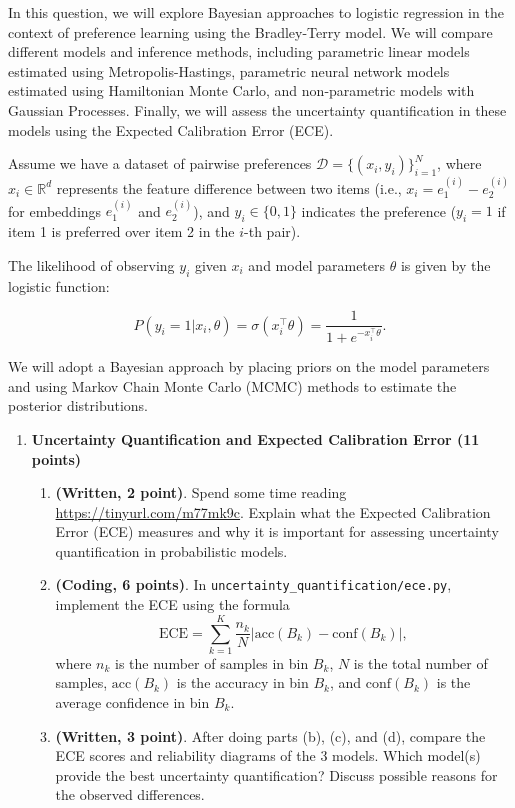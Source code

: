 \documentclass[
  letterpaper,
  numbers=noenddot,
  DIV=11]{scrreprt}
\theoremstyle{definition}
\theoremstyle{plain}
\theoremstyle{plain}
\theoremstyle{remark}
\begin{document}
In this question, we will explore Bayesian approaches to logistic
regression in the context of preference learning using the Bradley-Terry
model. We will compare different models and inference methods, including
parametric linear models estimated using Metropolis-Hastings, parametric
neural network models estimated using Hamiltonian Monte Carlo, and
non-parametric models with Gaussian Processes. Finally, we will assess
the uncertainty quantification in these models using the Expected
Calibration Error (ECE).

Assume we have a dataset of pairwise preferences
\(\mathcal{D} = \{(x_i, y_i)\}_{i=1}^N\), where \(x_i \in \mathbb{R}^d\)
represents the feature difference between two items (i.e.,
\(x_i = e^{(i)}_1 - e^{(i)}_2\) for embeddings \(e^{(i)}_1\) and
\(e^{(i)}_2\)), and \(y_i \in \{0, 1\}\) indicates the preference
(\(y_i = 1\) if item 1 is preferred over item 2 in the \(i\)-th pair).

The likelihood of observing \(y_i\) given \(x_i\) and model parameters
\(\theta\) is given by the logistic function:

\[P(y_i = 1 | x_i, \theta) = \sigma(x_i^\top \theta) = \frac{1}{1 + e^{-x_i^\top \theta}}.\]

We will adopt a Bayesian approach by placing priors on the model
parameters and using Markov Chain Monte Carlo (MCMC) methods to estimate
the posterior distributions.

\begin{enumerate}
\def\labelenumi{(\alph{enumi})}
\item
  \textbf{Uncertainty Quantification and Expected Calibration Error (11
  points)}

  \begin{enumerate}
  \def\labelenumii{(\roman{enumii})}
  \item
    \textbf{(Written, 2 point)}. Spend some time reading
    \url{https://tinyurl.com/m77mk9c}. Explain what the Expected
    Calibration Error (ECE) measures and why it is important for
    assessing uncertainty quantification in probabilistic models.
  \item
    \textbf{(Coding, 6 points)}. In
    \texttt{uncertainty\_quantification/ece.py}, implement the ECE using
    the formula
    \[\text{ECE} = \sum_{k=1}^K \frac{n_k}{N} \left| \text{acc}(B_k) - \text{conf}(B_k) \right|,\]
    where \(n_k\) is the number of samples in bin \(B_k\), \(N\) is the
    total number of samples, \(\text{acc}(B_k)\) is the accuracy in bin
    \(B_k\), and \(\text{conf}(B_k)\) is the average confidence in bin
    \(B_k\).
  \item
    \textbf{(Written, 3 point)}. After doing parts (b), (c), and (d),
    compare the ECE scores and reliability diagrams of the 3 models.
    Which model(s) provide the best uncertainty quantification? Discuss
    possible reasons for the observed differences.
  \end{enumerate}
\end{enumerate}
\end{document}
